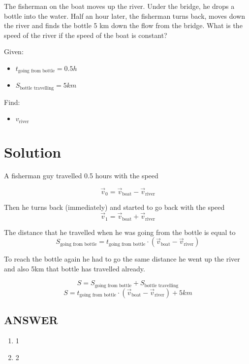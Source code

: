 The fisherman on the boat moves up the river. Under the bridge, he drops a bottle into the water.
Half an hour later, the fisherman turns back, moves down the river and finds the bottle 5 km
down the flow from the bridge. What is the speed of the river if the speed of the boat is constant?

\bigbreak Given: \begin{itemize}
    \item $t_{\text{going from bottle}} = 0.5h$
    \item $S_{\text{bottle travelling}} = 5km$
\end{itemize}

Find: \begin{itemize}
    \item $v_{\text{river}}$
\end{itemize}

\section*{Solution}

A fisherman guy travelled 0.5 hours with the speed

$$\Vec{v}_0 = \Vec{v}_{\text{boat}} - \Vec{v}_{\text{river}}$$

Then he turns back (immediately) and started to go back with the speed
$$\Vec{v}_1 = \Vec{v}_{\text{boat}} + \Vec{v}_{\text{river}}$$

The distance that he travelled when he was going from the bottle is equal to
$$S_{\text{going from bottle}} = t_{\text{going from bottle}} \cdot (\Vec{v}_{\text{boat}} - \Vec{v}_{\text{river}})$$

To reach the bottle again he had to go the same distance he went up the river and also 5km that bottle has travelled already.

$$S = S_{\text{going from bottle}} + S_{\text{bottle travelling}}$$
$$S =  t_{\text{going from bottle}} \cdot (\Vec{v}_{\text{boat}} - \Vec{v}_{\text{river}}) + 5km$$


\vfill
\subsection*{ANSWER}
\begin{enumerate}
    \item 1
    \item 2
\end{enumerate}

